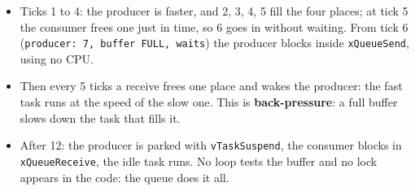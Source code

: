 \begin{itemize}
    \item Ticks 1 to 4: the producer is faster, and 2, 3, 4, 5 fill the four places; at tick 5 the consumer frees one just in time, so 6 goes in without waiting. From tick 6 (\texttt{producer: 7, buffer FULL, waits}) the producer blocks inside \texttt{xQueueSend}, using no CPU.
    \item Then every 5 ticks a receive frees one place and wakes the producer: the fast task runs at the speed of the slow one. This is \textbf{back-pressure}: a full buffer slows down the task that fills it.
    \item After 12: the producer is parked with \texttt{vTaskSuspend}, the consumer blocks in \texttt{xQueueReceive}, the idle task runs. No loop tests the buffer and no lock appears in the code: the queue does it all.
\end{itemize}


